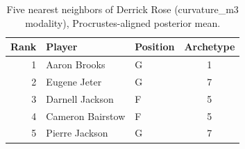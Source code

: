 \begin{table}[htbp]
  \centering\small
  \begin{tabular}{rllc}
    \toprule
    Rank & Player & Position & Archetype \\
    \midrule
    1 & Aaron Brooks & G & 1 \\
    2 & Eugene Jeter & G & 7 \\
    3 & Darnell Jackson & F & 5 \\
    4 & Cameron Bairstow & F & 5 \\
    5 & Pierre Jackson & G & 7 \\
    \bottomrule
  \end{tabular}
  \caption{Five nearest neighbors of Derrick Rose (curvature_m3 modality), Procrustes-aligned posterior mean.}
  \label{tab:Derrick_Rose_neighbors_curvature_m3}
\end{table}


